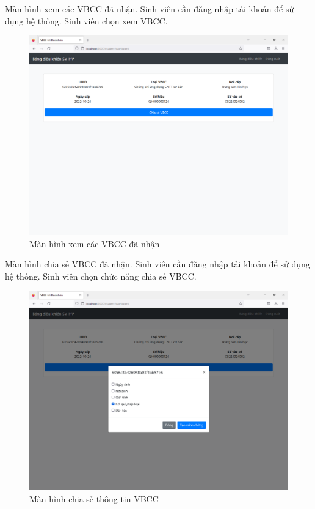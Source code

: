 Màn hình xem các VBCC đã nhận.
Sinh viên cần đăng nhập tải khoản để sử dụng hệ thống.
Sinh viên chọn xem VBCC.
\begin{figure}[H]
\centering
\includegraphics[width=.9\linewidth]{img/sv_hva.PNG}
\caption{Màn hình xem các VBCC đã nhận}
\label{fig:sv_hva}
\end{figure}

Màn hình chia sẻ VBCC đã nhận.
Sinh viên cần đăng nhập tải khoản để sử dụng hệ thống.
Sinh viên chọn chức năng chia sẻ VBCC.
\begin{figure}[H]
\centering
\includegraphics[width=.9\linewidth]{img/sv_chiase.PNG}
\caption{Màn hình chia sẻ thông tin VBCC}
\label{fig:sv_chiase}
\end{figure}

